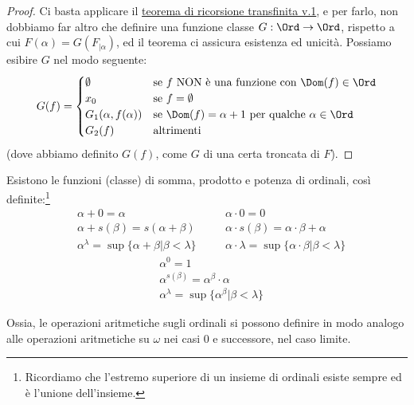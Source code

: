 \documentclass[11pt]{scrartcl}
\begin{document}
\begin{proof}
	Ci basta applicare il \hyperref[ric_transf1]{teorema di ricorsione transfinita v.1}, e per farlo, non dobbiamo far altro che definire una funzione classe $G : \Ord \rightarrow \Ord$, rispetto a cui $F(\alpha) = G(F_{|\alpha})$, ed il teorema ci assicura esistenza ed unicità.
	Possiamo esibire $G$ nel modo seguente:
	\[ G(f) = \begin{cases}
		\emptyset &\text{se $f$ NON è una funzione con $\Dom(f) \in \Ord$} \\
		x_0 &\text{se $f = \emptyset$} \\
		G_1(\alpha,f(\alpha)) &\text{se $\Dom(f) = \alpha + 1$ per qualche $\alpha \in \Ord$} \\
		G_2(f) &\text{altrimenti}
	\end{cases}
		\]
	(dove abbiamo definito $G(f)$, come $G$ di una certa troncata di $F$).
\end{proof}

\begin{corollary}
	Esistono le funzioni (classe) di somma, prodotto e potenza di ordinali, così definite:\footnote{Ricordiamo che l'estremo superiore di un insieme di ordinali esiste sempre ed è l'unione dell'insieme.}
	\begin{align*}
		&\alpha + 0 = \alpha &\quad &\alpha \cdot 0 = 0 \\
		&\alpha + s(\beta) = s(\alpha + \beta)  &\quad &\alpha \cdot s(\beta) = \alpha \cdot \beta + \alpha \\
		&\alpha^\lambda = \sup\{\alpha + \beta | \beta < \lambda\} &\quad &\alpha\cdot \lambda = \sup\{\alpha \cdot \beta | \beta < \lambda\}
	\end{align*}
	\begin{align*}
		&\alpha^0 = 1 \\
		&\alpha^{s(\beta)} = \alpha^\beta \cdot \alpha \\
		&\alpha^{\lambda} = \sup\{\alpha^\beta | \beta < \lambda\}
	\end{align*}
\end{corollary}

Ossia, le operazioni aritmetiche sugli ordinali si possono definire in modo analogo alle operazioni aritmetiche su $\omega$ nei casi 0 e successore,
 nel caso limite.
\end{document}
